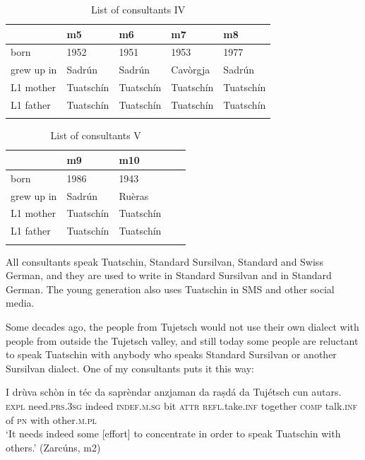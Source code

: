 \begin{table}
	\caption{List of consultants IV}
	\label{tab:consultantsIV}
	\begin{tabular}{lllll}
		\lsptoprule
		& m5 & m6 & m7 & m8\\
		\midrule
		born & 1952 & 1951 & 1953 & 1977\\
		grew up in & Sadrún & Sadrún & Cavòrgja & Sadrún\\
		L1 mother & Tuatschín & Tuatschín & Tuatschín & Tuatschín \\
		L1 father & Tuatschín & Tuatschín  & Tuatschín & Tuatschín\\
		\lspbottomrule
	\end{tabular}
\end{table}

\begin{table}
	\caption{List of consultants V}
	\label{tab:consultantsV}
	\begin{tabular}{lllll}
		\lsptoprule
		& m9 & m10\\
		\midrule
		born   & 1986 & 1943\\
		grew up in   &  Sadrún & Ruèras \\
		L1 mother & Tuatschín & Tuatschín\\
		L1 father  & Tuatschín & Tuatschín\\
		\lspbottomrule
		\end{tabular}
\end{table}

All consultants speak Tuatschin, Standard Sursilvan, Standard and Swiss German, and they are used to write in Standard Sursilvan and in Standard German. The young generation also uses Tuatschin in SMS and other social media.

Some decades ago, the people from Tujetsch would not use their own dialect with people from outside the Tujetsch valley, and still today some people are reluctant to speak Tuatschin with anybody who speaks Standard Sursilvan or another Sursilvan dialect. One of my consultants puts it this way:

\ea

\gll I drùva schòn in téc da saprèndar anzjaman da raṣdá da Tujétsch cun autars.\\
\textsc{expl} need.\textsc{prs.3sg} indeed \textsc{indef.m.sg} bit \textsc{attr} \textsc{refl}.take.\textsc{inf} together \textsc{comp} talk.\textsc{inf} of \textsc{pn} with other.\textsc{m.pl}\\
\glt `It needs indeed some [effort] to concentrate in order to speak Tuatschin with others.' (Zarcúns, m2)
\z


